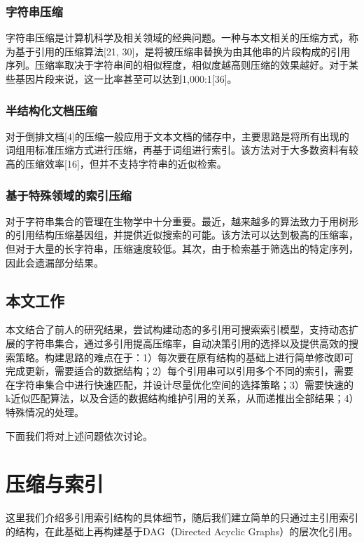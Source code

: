 ﻿\documentclass{sysuthesis}
\begin{document}
\subsection{字符串压缩}
字符串压缩是计算机科学及相关领域的经典问题。一种与本文相关的压缩方式，称为基于引用的压缩算法[21, 30]，是将被压缩串替换为由其他串的片段构成的引用序列。压缩率取决于字符串间的相似程度，相似度越高则压缩的效果越好。对于某些基因片段来说，这一比率甚至可以达到1,000:1[36]。



\subsection{半结构化文档压缩}
对于倒排文档[4]的压缩一般应用于文本文档的储存中，主要思路是将所有出现的词组用标准压缩方式进行压缩，再基于词组进行索引。该方法对于大多数资料有较高的压缩效率[16]，但并不支持字符串的近似检索。



\subsection{基于特殊领域的索引压缩}
对于字符串集合的管理在生物学中十分重要。最近，越来越多的算法致力于用树形的引用结构压缩基因组，并提供近似搜索的可能。该方法可以达到极高的压缩率，但对于大量的长字符串，压缩速度较低。其次，由于检索基于筛选出的特定序列，因此会遗漏部分结果。



\section{本文工作}
本文结合了前人的研究结果，尝试构建动态的多引用可搜索索引模型，支持动态扩展的字符串集合，通过多引用提高压缩率，自动决策引用的选择以及提供高效的搜索策略。构建思路的难点在于：1）每次要在原有结构的基础上进行简单修改即可完成更新，需要适合的数据结构；2）每个引用串可以引用多个不同的索引，需要在字符串集合中进行快速匹配，并设计尽量优化空间的选择策略；3）需要快速的k近似匹配算法，以及合适的数据结构维护引用的关系，从而递推出全部结果；4）特殊情况的处理。\par
下面我们将对上述问题依次讨论。



\chapter{压缩与索引}
这里我们介绍多引用索引结构的具体细节，随后我们建立简单的只通过主引用索引的结构，在此基础上再构建基于DAG（Directed Acyclic Graphs）的层次化引用。
\end{document}
